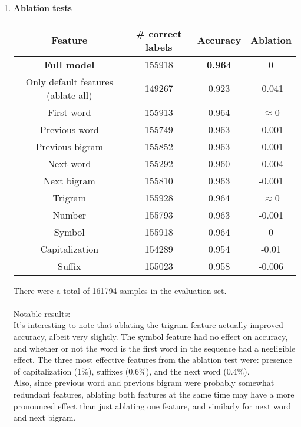 \documentclass[11pt]{exam}
\theoremstyle{quest}
\begin{document}
\begin{enumerate}
\begin{enumerate}
	\end{enumerate}

	\item \textbf{Ablation tests} \\
	\begin{center}
	\begin{tabular}{ |c|c|c|c| } 
	\hline
	\textbf{Feature} & \textbf{\# correct labels} & \textbf{Accuracy} & \textbf{Ablation} \\ 
	\hline
	\hline
	\textbf{Full model} & 155918 & \textbf{0.964} & 0 \\ \hline
	Only default features (ablate all) & 149267 & 0.923 & -0.041\\ \hline
	\hline
	First word & 155913 & 0.964 & $\approx$0\\ \hline
	Previous word & 155749 & 0.963 & -0.001 \\ \hline
	Previous bigram & 155852 & 0.963 & -0.001 \\ \hline
	Next word & 155292 & 0.960 & -0.004 \\ \hline
	Next bigram & 155810 & 0.963 & -0.001 \\ \hline
	Trigram & 155928 & 0.964 & $\approx$0\\ \hline
	Number & 155793 & 0.963 & -0.001\\ \hline
	Symbol & 155918 & 0.964 & 0 \\ \hline
	Capitalization & 154289 & 0.954 & -0.01\\ \hline
	Suffix & 155023 & 0.958 & -0.006\\ \hline
\end{tabular}
\end{center}
There were a total of 161794 samples in the evaluation set. \\
\\
Notable results: \\
It's interesting to note that ablating the trigram feature actually improved accuracy, albeit very slightly. The symbol feature had no effect on accuracy, and whether or not the word is the first word in the sequence had a negligible effect. The three most effective features from the ablation test were: presence of capitalization (1\%), suffixes (0.6\%), and the next word (0.4\%). \\
Also, since previous word and previous bigram were probably somewhat redundant features, ablating both features at the same time may have a more pronounced effect than just ablating one feature, and similarly for next word and next bigram. 

\end{enumerate}
\end{document}
